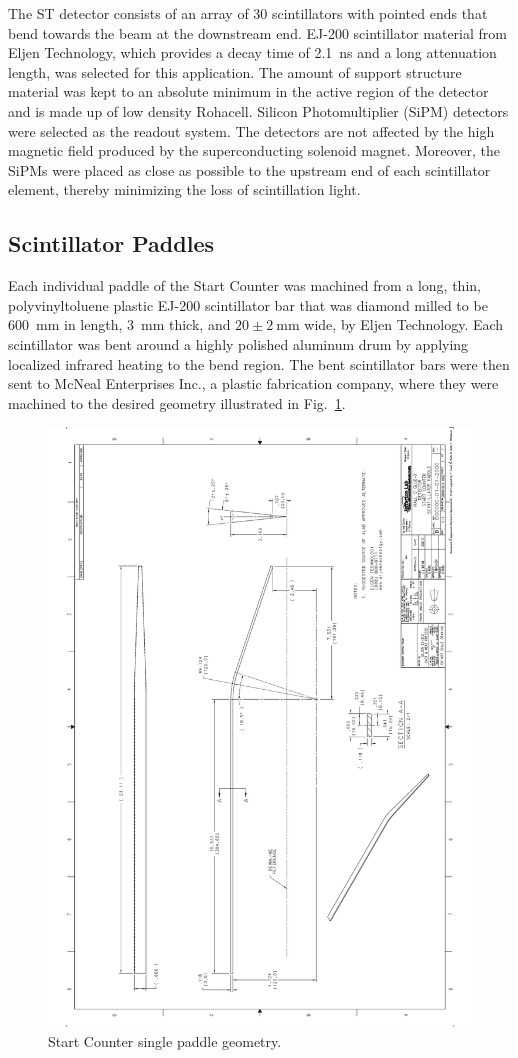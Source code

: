 The ST detector consists of an array of 30 scintillators with pointed ends that bend towards the beam at the downstream end. EJ-200 scintillator material from Eljen Technology\cite{eljen}, which provides a decay time of 2.1~ns and a long attenuation length\cite{ej200_specs}, was selected for this application.  The amount of support structure material was kept to an absolute minimum in the active region of the detector and is made up of low density Rohacell\cite{rohacell}. Silicon Photomultiplier (SiPM) detectors were selected as the readout system. The detectors are not affected by the high magnetic field produced by the superconducting solenoid magnet. Moreover, the SiPMs were placed as close as possible to the upstream end of each scintillator element, thereby minimizing the loss of scintillation light\cite{pooser16}.

\subsection{Scintillator Paddles} \label{sec:design_paddles}

Each individual paddle of the Start Counter was machined from a long, thin, polyvinyltoluene plastic EJ-200 scintillator bar that was diamond milled to be 600~mm in length, 3~mm thick, and $\mathrm{20 \pm 2\ mm}$ wide, by Eljen Technology.  Each scintillator was bent around a highly polished aluminum drum by applying localized infrared heating to the bend region.  The bent scintillator bars were then sent to McNeal Enterprises Inc.\cite{mcneal}, a plastic fabrication company, where they were machined to the desired geometry illustrated in Fig.~\ref{fig:Scintillator Geometry}.
\begin{figure}[!htb]
	\centering
	\includegraphics[width=0.7\columnwidth,angle=270.]{design/figs/Scint_Geo}
	\caption[Start Counter single paddle geometry]{Start Counter single paddle geometry.}
	\label{fig:Scintillator Geometry}
\end{figure}

